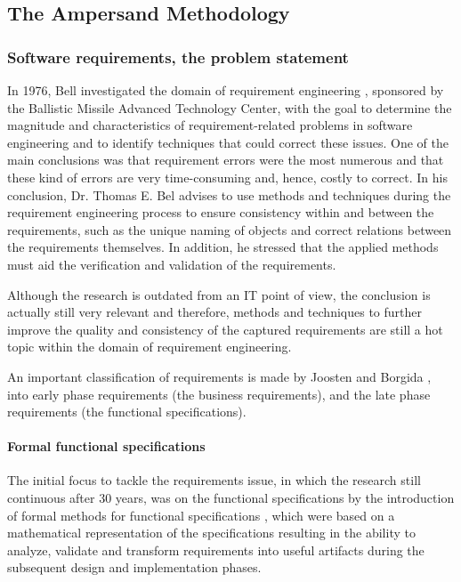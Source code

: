 
\subsection{The Ampersand Methodology}
\label{sec:AmpersandTheory}

\subsubsection{Software requirements, the problem statement}

In 1976, Bell investigated the domain of requirement engineering , sponsored by the Ballistic Missile Advanced Technology Center, with the goal to determine the magnitude and characteristics of requirement-related problems in software engineering and to identify techniques that could correct these issues. 
One of the main conclusions was that requirement errors were the most numerous and that these kind of errors are very time-consuming and, hence, costly to correct.
In his conclusion, Dr. Thomas E. Bel advises to use methods and techniques during the requirement engineering process to ensure consistency within and  between the requirements, such as the unique naming of objects and correct relations between the requirements themselves.
In addition, he stressed that the applied methods must aid the verification and validation of the requirements.
 
Although the research is outdated from an IT point of view, the conclusion is actually still very relevant and therefore, methods and techniques to further improve the quality and consistency of the captured requirements are still a hot topic within the domain of requirement engineering.

An important classification of requirements is made by Joosten  and Borgida , into early phase requirements (the business requirements), and the late phase requirements (the functional specifications). 

\paragraph{Formal functional specifications}
The initial focus to tackle the requirements issue, in which the research still continuous after 30 years, was on the functional specifications by the introduction of formal methods for functional specifications , which were based on a mathematical representation of the specifications resulting in the ability to analyze, validate and transform requirements into useful artifacts during the subsequent design and implementation phases. 

